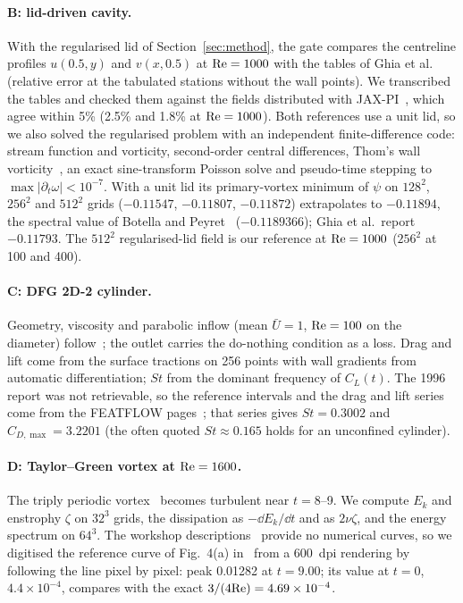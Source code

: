 \paragraph{B: lid-driven cavity.} With the regularised lid of Section~\ref{sec:method}, the gate compares the
centreline profiles $u(0.5,y)$ and $v(x,0.5)$ at $\mathrm{Re}=1000$ with the tables of Ghia et al.~\cite{ghia1982} (relative
error at the tabulated stations without the wall points). We transcribed the tables and checked them against
the fields distributed with JAX-PI~\cite{jaxpi}, which agree within 5\% (2.5\% and 1.8\% at $\mathrm{Re}=1000$). Both
references use a unit lid, so we also solved the regularised problem with an independent finite-difference code:
stream function and vorticity, second-order central differences, Thom's wall vorticity~\cite{thom1933}, an exact
sine-transform Poisson solve and pseudo-time stepping to $\max|\partial_t\omega|<10^{-7}$. With a unit lid its
primary-vortex minimum of $\psi$ on $128^2$, $256^2$ and $512^2$ grids ($-0.11547$, $-0.11807$, $-0.11872$)
extrapolates to $-0.11894$, the spectral value of Botella and Peyret~\cite{botella1998} ($-0.1189366$); Ghia et al.\
report $-0.11793$. The $512^2$ regularised-lid field is our reference at $\mathrm{Re}=1000$ ($256^2$ at 100 and 400).

\paragraph{C: DFG 2D-2 cylinder.} Geometry, viscosity and parabolic inflow (mean $\bar U=1$, $\mathrm{Re}=100$ on the
diameter) follow~\cite{schaefer1996}; the outlet carries the do-nothing condition as a loss. Drag and lift come
from the surface tractions on 256 points with wall gradients from automatic differentiation; $St$ from the
dominant frequency of $C_L(t)$. The 1996 report was not retrievable, so the reference intervals and the drag and
lift series come from the FEATFLOW pages~\cite{featflow}; that series gives $St=0.3002$ and $C_{D,\max}=3.2201$
(the often quoted $St\approx0.165$ holds for an unconfined cylinder).

\paragraph{D: Taylor--Green vortex at $\mathrm{Re}=1600$.} The triply periodic vortex~\cite{brachet1983} becomes
turbulent near $t=8$--9. We compute $E_k$ and enstrophy $\zeta$ on $32^3$ grids, the dissipation as
$-\dd E_k/\dd t$ and as $2\nu\zeta$, and the energy spectrum on $64^3$. The workshop descriptions~\cite{wang2013hiocfd}
provide no numerical curves, so we digitised the reference curve of Fig.~4(a) in~\cite{debonis2013} from a
600~dpi rendering by following the line pixel by pixel: peak 0.01282 at $t=9.00$; its value at $t=0$,
$4.4\times10^{-4}$, compares with the exact $3/(4\mathrm{Re})=4.69\times10^{-4}$.

